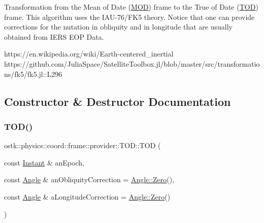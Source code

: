 Transformation from the Mean of Date (\hyperlink{classostk_1_1physics_1_1coord_1_1frame_1_1provider_1_1_m_o_d}{M\+OD}) frame to the True of Date (\hyperlink{classostk_1_1physics_1_1coord_1_1frame_1_1provider_1_1_t_o_d}{T\+OD}) frame. This algorithm uses the I\+A\+U-\/76/\+F\+K5 theory. Notice that one can provide corrections for the nutation in obliquity and in longitude that are usually obtained from I\+E\+RS E\+OP Data.

https\+://en.wikipedia.\+org/wiki/\+Earth-\/centered\+\_\+inertial https\+://github.com/\+Julia\+Space/\+Satellite\+Toolbox.\+jl/blob/master/src/transformations/fk5/fk5.jl\+::\+L296 

\subsection{Constructor \& Destructor Documentation}
\mbox{\label{classostk_1_1physics_1_1coord_1_1frame_1_1provider_1_1_t_o_d_a457cb11c5a20ea3b575aa6c3887bd085}} 
\subsubsection{\texorpdfstring{T\+O\+D()}{TOD()}}
{\footnotesize\ttfamily ostk\+::physics\+::coord\+::frame\+::provider\+::\+T\+O\+D\+::\+T\+OD (\begin{DoxyParamCaption}\item[{const \hyperlink{classostk_1_1physics_1_1time_1_1_instant}{Instant} \&}]{an\+Epoch,  }\item[{const \hyperlink{classostk_1_1physics_1_1units_1_1_angle}{Angle} \&}]{an\+Obliquity\+Correction = {\ttfamily \hyperlink{classostk_1_1physics_1_1units_1_1_angle_a4454975f87e5d3532cf8b819819207e7}{Angle\+::\+Zero}()},  }\item[{const \hyperlink{classostk_1_1physics_1_1units_1_1_angle}{Angle} \&}]{a\+Longitude\+Correction = {\ttfamily \hyperlink{classostk_1_1physics_1_1units_1_1_angle_a4454975f87e5d3532cf8b819819207e7}{Angle\+::\+Zero}()} }\end{DoxyParamCaption})}

\mbox{\label{classostk_1_1physics_1_1coord_1_1frame_1_1provider_1_1_t_o_d_a1e59c3f3d3d31e768deb99abb502b577}} 
